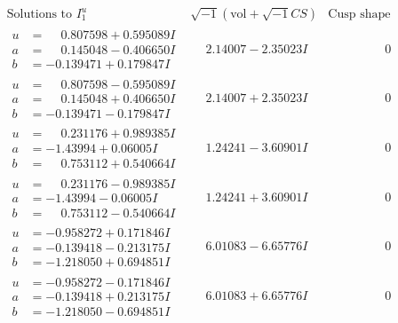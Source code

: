 \documentclass[1p]{elsarticle_modified}
\theoremstyle{definition}
\newcommand{\I}{\sqrt{-1}}
\begin{document}
$$\begin{array}{c|c|c}  
\text{Solutions to }I^u_{1}& \I (\text{vol} + \sqrt{-1}CS) & \text{Cusp shape}\\
 \hline 
\begin{aligned}
u &= \phantom{-}0.807598 + 0.595089 I \\
a &= \phantom{-}0.145048 - 0.406650 I \\
b &= -0.139471 + 0.179847 I\end{aligned}
 & \phantom{-}2.14007 - 2.35023 I & \phantom{-0.000000 } 0 \\ \hline\begin{aligned}
u &= \phantom{-}0.807598 - 0.595089 I \\
a &= \phantom{-}0.145048 + 0.406650 I \\
b &= -0.139471 - 0.179847 I\end{aligned}
 & \phantom{-}2.14007 + 2.35023 I & \phantom{-0.000000 } 0 \\ \hline\begin{aligned}
u &= \phantom{-}0.231176 + 0.989385 I \\
a &= -1.43994 + 0.06005 I \\
b &= \phantom{-}0.753112 + 0.540664 I\end{aligned}
 & \phantom{-}1.24241 - 3.60901 I & \phantom{-0.000000 } 0 \\ \hline\begin{aligned}
u &= \phantom{-}0.231176 - 0.989385 I \\
a &= -1.43994 - 0.06005 I \\
b &= \phantom{-}0.753112 - 0.540664 I\end{aligned}
 & \phantom{-}1.24241 + 3.60901 I & \phantom{-0.000000 } 0 \\ \hline\begin{aligned}
u &= -0.958272 + 0.171846 I \\
a &= -0.139418 - 0.213175 I \\
b &= -1.218050 + 0.694851 I\end{aligned}
 & \phantom{-}6.01083 - 6.65776 I & \phantom{-0.000000 } 0 \\ \hline\begin{aligned}
u &= -0.958272 - 0.171846 I \\
a &= -0.139418 + 0.213175 I \\
b &= -1.218050 - 0.694851 I\end{aligned}
 & \phantom{-}6.01083 + 6.65776 I & \phantom{-0.000000 } 0 \\ \hline\begin{aligned}

\end{aligned}
\end{array}$$
\end{document}
